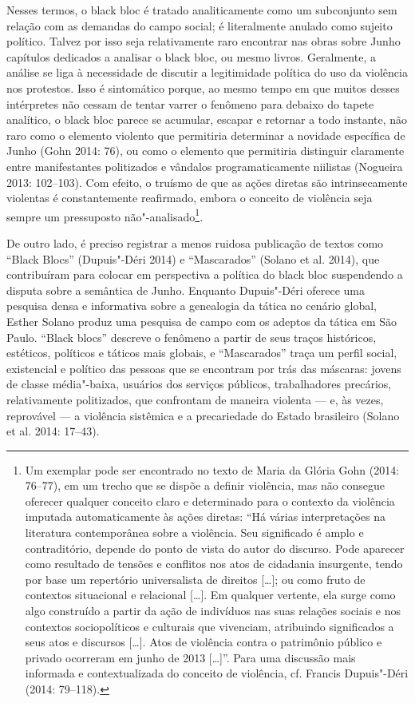 Nesses termos, o black bloc é tratado
analiticamente como um subconjunto sem relação com as demandas do campo
social; é literalmente anulado como sujeito político. Talvez por isso
seja relativamente raro encontrar nas obras sobre Junho capítulos
dedicados a analisar o black bloc, ou mesmo livros. Geralmente, a
análise se liga à necessidade de discutir a legitimidade política do uso
da violência nos protestos. Isso é sintomático porque, ao mesmo tempo em
que muitos desses intérpretes não cessam de tentar varrer o fenômeno
para debaixo do tapete analítico, o black bloc parece se acumular,
escapar e retornar a todo instante, não raro como o elemento violento
que permitiria determinar a novidade específica de Junho (Gohn 2014:
76), ou como o elemento que permitiria distinguir claramente entre
manifestantes politizados e vândalos programaticamente niilistas
(Nogueira 2013: 102--103). Com efeito, o truísmo de que as ações diretas
são intrinsecamente violentas é constantemente reafirmado, embora o
conceito de violência seja sempre um pressuposto não"-analisado\footnote{Um
  exemplar pode ser encontrado no texto de Maria da Glória Gohn (2014:
  76--77), em um trecho que se dispõe a definir violência, mas não
  consegue oferecer qualquer conceito claro e determinado para o
  contexto da violência imputada automaticamente às ações diretas: ``Há
  várias interpretações na literatura contemporânea sobre a violência.
  Seu significado é amplo e contraditório, depende do ponto de vista do
  autor do discurso. Pode aparecer como resultado de tensões e conflitos
  nos atos de cidadania insurgente, tendo por base um repertório
  universalista de direitos {[}\ldots{}{]}; ou como fruto de contextos
  situacional e relacional {[}\ldots{}{]}. Em qualquer vertente, ela
  surge como algo construído a partir da ação de indivíduos nas suas
  relações sociais e nos contextos sociopolíticos e culturais que
  vivenciam, atribuindo significados a seus atos e discursos
  {[}\ldots{}{]}. Atos de violência contra o patrimônio público e privado
  ocorreram em junho de 2013 {[}\ldots{}{]}''. Para uma discussão mais
  informada e contextualizada do conceito de violência, cf. Francis
  Dupuis"-Déri (2014: 79--118).}.

De outro lado, é preciso registrar a menos ruidosa publicação de textos
como ``Black Blocs'' (Dupuis"-Déri 2014) e ``Mascarados'' (Solano et al.
2014), que contribuíram para colocar em perspectiva a política do black
bloc suspendendo a disputa sobre a semântica de Junho. Enquanto
Dupuis"-Déri oferece uma pesquisa densa e informativa sobre a genealogia
da tática no cenário global, Esther Solano produz uma pesquisa de campo
com os adeptos da tática em São Paulo. ``Black blocs'' descreve o
fenômeno a partir de seus traços históricos, estéticos, políticos e
táticos mais globais, e ``Mascarados'' traça um perfil social,
existencial e político das pessoas que se encontram por trás das
máscaras: jovens de classe média"-baixa, usuários dos serviços públicos,
trabalhadores precários, relativamente politizados, que confrontam de
maneira violenta --- e, às vezes, reprovável --- a violência sistêmica e a
precariedade do Estado brasileiro (Solano et al. 2014: 17--43).

